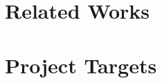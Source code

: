 \documentclass{article}
\begin{document}
\section{Related Works}

\section{Project Targets}





\end{document}
